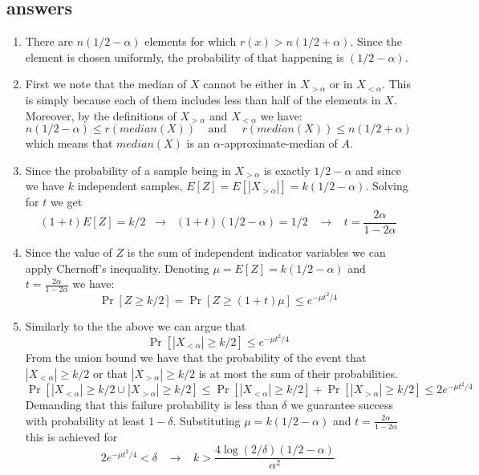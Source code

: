 \documentclass{article}
\begin{document}

\subsection*{answers}
\begin{enumerate}
\item There are $n(1/2 - \alpha)$ elements for which $r(x) > n(1/2 + \alpha)$.
Since the element is chosen uniformly, the probability of that happening is $(1/2 - \alpha)$.
\item First we note that the median of $X$ cannot be either in $X_{>\alpha}$ or in $X_{<\alpha}$.
This is simply because each of them includes less than half of the elements in $X$.
Moreover, by the definitions of $X_{>\alpha}$ and $X_{<\alpha}$ we have:
\[
n(1/2 - \alpha) \le r(median(X)) \;\;\;\;\mbox{and}\;\;\;\;\;  r(median(X))  \le n(1/2 + \alpha)
\]
which means that $median(X)$ is an $\alpha$-approximate-median of $A$.
\item Since the probability of a sample being in $X_{>\alpha}$ is exactly $1/2-\alpha$ 
and since we have $k$ independent samples, $E[Z] = E[|X_{>\alpha}|] = k(1/2-\alpha)$.
Solving for $t$ we get 
\[
(1+t)E[Z] = k/2 \;\;\rightarrow\;\;  (1+t)(1/2-\alpha) = 1/2 \;\;\;\rightarrow\;\;\; t = \frac{2\alpha}{1-2\alpha}
\]
\item Since the value of $Z$ is the sum of independent indicator variables we can apply Chernoff's inequality.
Denoting $\mu = E[Z] = k(1/2-\alpha)$ and $t = \frac{2\alpha}{1-2\alpha}$ we have:
\[
\Pr[Z \ge k/2] = \Pr[Z \ge (1+t)\mu] \le e^{-\mu t^2/4} 
\] 

\item Similarly to the the above we can argue that 
\[
\Pr[|X_{<\alpha}| \ge k/2] \le e^{-\mu t^2/4}
\]
From the union bound we have that the probability of the event that $|X_{<\alpha}| \ge k/2$
or that $|X_{>\alpha}| \ge k/2$ is at most the sum of their probabilities.
\[
\Pr \left[|X_{<\alpha}| \ge k/2 \cup |X_{>\alpha}| \ge k/2 \right] \le \Pr\left[|X_{<\alpha}| \ge k/2\right] + \Pr[|X_{>\alpha}| \ge k/2] \le 2e^{-\mu t^2/4}
\] 
Demanding that this failure probability is less than $\delta$ we guarantee success with probability at least $1-\delta$.
Substituting $\mu = k(1/2- \alpha)$ and $t = \frac{2\alpha}{1-2\alpha}$ this is achieved for 
\[
2e^{-\mu t^2/4} < \delta \;\;\;\rightarrow\;\;\; k > \frac{4\log(2/\delta)(1/2-\alpha)}{\alpha^2}  
\]
\end{enumerate}
\end{document}
